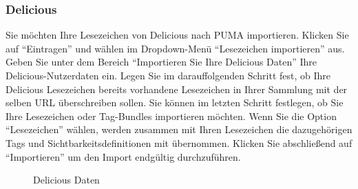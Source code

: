 \subsubsection{Delicious}
Sie möchten Ihre Lesezeichen von Delicious nach PUMA importieren. Klicken Sie auf \enquote{Eintragen} und wählen im Dropdown-Menü \enquote{Lesezeichen importieren} aus. Geben Sie unter dem Bereich \enquote{Importieren Sie Ihre Delicious Daten} Ihre Delicious-Nutzerdaten ein. \newline
Legen Sie im darauffolgenden Schritt fest, ob Ihre Delicious Lesezeichen bereits vorhandene Lesezeichen in Ihrer Sammlung mit der selben URL überschreiben sollen.\newline
Sie können im letzten Schritt festlegen, ob Sie Ihre Lesezeichen oder Tag-Bundles importieren möchten. Wenn Sie die Option \enquote{Lesezeichen} wählen, werden zusammen mit Ihren Lesezeichen die dazugehörigen Tags und Sichtbarkeitsdefinitionen mit übernommen.
\newline Klicken Sie abschließend auf \enquote{Importieren} um den Import endgültig durchzuführen.
\begin{figure}[h!]
 \centering
 \caption{Delicious Daten}
 \label{figure3}
\end{figure} 
